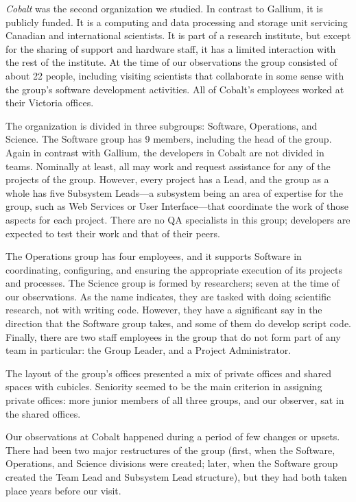 \documentclass[10pt, conference, compsocconf]{IEEEtran}
\begin{document}
\emph{Cobalt} was the second organization we studied. In contrast to Gallium, it is publicly funded. It is a computing and data processing and storage unit servicing Canadian and international scientists. It is part of a research institute, but except for the sharing of support and hardware staff, it has a limited interaction with the rest of the institute. At the time of our observations the group consisted of about 22 people, including visiting scientists that collaborate in some sense with the group's software development activities. All of Cobalt's employees worked at their Victoria offices.

The organization is divided in three subgroups: Software, Operations, and Science. The Software group has 9 members, including the head of the group. Again in contrast with Gallium, the developers in Cobalt are not divided in teams. Nominally at least, all may work and request assistance for any of the projects of the group. However, every project has a Lead, and the group as a whole has five Subsystem Leads---a subsystem being an area of expertise for the group, such as Web Services or User Interface---that coordinate the work of those aspects for each project. There are no QA specialists in this group; developers are expected to test their work and that of their peers.

The Operations group has four employees, and it supports Software in coordinating, configuring, and ensuring the appropriate execution of its projects and processes. The Science group is formed by researchers; seven at the time of our observations. As the name indicates, they are tasked with doing scientific research, not with writing code. However, they have a significant say in the direction that the Software group takes, and some of them do develop script code. Finally, there are two staff employees in the group that do not form part of any team in particular: the Group Leader, and a Project Administrator.

The layout of the group's offices presented a mix of private offices and shared spaces with cubicles. Seniority seemed to be the main criterion in assigning private offices: more junior members of all three groups, and our observer, sat in the shared offices.

Our observations at Cobalt happened during a period of few changes or upsets. There had been two major restructures of the group (first, when the Software, Operations, and Science divisions were created; later, when the Software group created the Team Lead and Subsystem Lead structure), but they had both taken place years before our visit.
\end{document}
